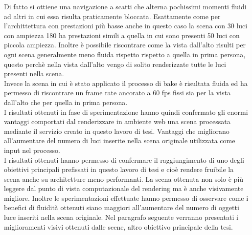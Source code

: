 Di fatto si ottiene una navigazione a scatti che alterna pochissimi momenti fluidi ad altri in cui essa risulta praticamente bloccata.
Esattamente come per l’archittettura con prestazioni più basse anche in questo caso la scena con 30 luci con ampiezza 180 ha prestazioni simili a quella in cui sono presenti 50 luci con piccola ampiezza.
Inoltre è possibile riscontrare come la vista dall’alto risulti per ogni scena generalmente meno fluida rispetto rispetto a quella in prima persona, questo perchè nella vista dall’alto vengo di solito renderizzate tutte le luci presenti nella scena.
\\
Invece la scena in cui è stato applicato il processo di bake è risultata fluida ed ha permesso di riscontrare un frame rate ancorato a 60 fps fissi sia per la vista dall’alto che per quella in prima persona.
\\
I risultati ottenuti in fase di sperimentazione hanno quindi confermato gli enormi vantaggi comportati dal renderizzare in ambiente web una scena processata mediante il servizio creato in questo lavoro di tesi.
Vantaggi che  migliorano all’aumentare del numero di luci inserite nella scena originale utilizzata come input nel processo.
\\
I risultati ottenuti hanno permesso di confermare il raggiungimento di uno degli obiettivi principali prefissati in questo lavoro di tesi e cioè rendere fruibile la scena anche su architetture meno performanti.
La scena ottenuta non solo è più leggere dal punto di vista computazionale del rendering ma è anche visivamente migliore.
Inoltre le sperimentazioni effettuate hanno permesso di osservare come i benefici di fluidità ottenuti siano maggiori all'aumentare del numero di oggetti luce inseriti nella scena originale.
Nel paragrafo seguente verranno presentati i miglioramenti visivi ottenuti dalle scene, altro obiettivo principale della tesi.

